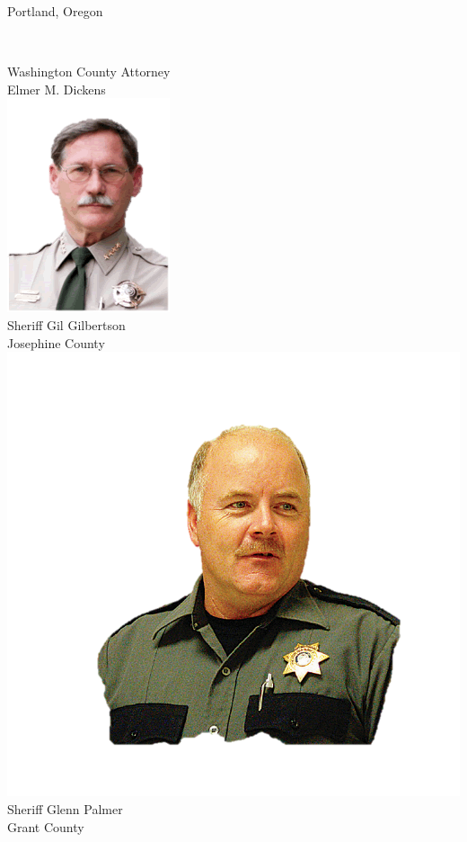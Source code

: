 \documentclass{beamer}
\begin{document}
\begin{frame}{Portland, Oregon}
\begin{columns}[onlytextwidth]
            \\ Washington County Attorney \\ Elmer M. Dickens \\

            \centering
            \includegraphics[height=0.28\textheight]{img/gil-gilbertson.png}
            \\ Sheriff Gil Gilbertson \\ Josephine County \\
            \includegraphics[height=0.28\textheight]{img/glenn-palmer.png}
            \\ Sheriff Glenn Palmer \\ Grant County \\

    \end{columns}
\end{frame}
\end{document}

